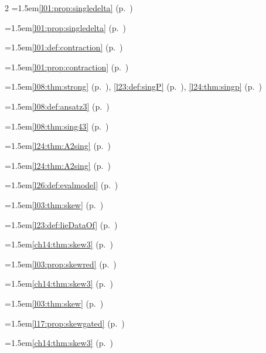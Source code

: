 \begin{multicols}{2}
\hangindent=1.5em\quad \ref{l01:prop:singledelta} (p.~\pageref{l01:prop:singledelta})\par
\hangindent=1.5em\quad \ref{l01:prop:singledelta} (p.~\pageref{l01:prop:singledelta})\par
\hangindent=1.5em\quad \ref{l01:def:contraction} (p.~\pageref{l01:def:contraction})\par
\hangindent=1.5em\quad \ref{l01:prop:contraction} (p.~\pageref{l01:prop:contraction})\par
\hangindent=1.5em\quad \ref{l08:thm:strong} (p.~\pageref{l08:thm:strong}), \ref{l23:def:singP} (p.~\pageref{l23:def:singP}), \ref{l24:thm:singp} (p.~\pageref{l24:thm:singp})\par
\hangindent=1.5em\quad \ref{l08:def:ansatz3} (p.~\pageref{l08:def:ansatz3})\par
\hangindent=1.5em\quad \ref{l08:thm:sing43} (p.~\pageref{l08:thm:sing43})\par
\hangindent=1.5em\quad \ref{l24:thm:A2sing} (p.~\pageref{l24:thm:A2sing})\par
\hangindent=1.5em\quad \ref{l24:thm:A2sing} (p.~\pageref{l24:thm:A2sing})\par
\hangindent=1.5em\quad \ref{l26:def:evalmodel} (p.~\pageref{l26:def:evalmodel})\par
\hangindent=1.5em\quad \ref{l03:thm:skew} (p.~\pageref{l03:thm:skew})\par
\hangindent=1.5em\quad \ref{l23:def:lieDataOf} (p.~\pageref{l23:def:lieDataOf})\par
\hangindent=1.5em\quad \ref{ch14:thm:skew3} (p.~\pageref{ch14:thm:skew3})\par
\hangindent=1.5em\quad \ref{l03:prop:skewred} (p.~\pageref{l03:prop:skewred})\par
\hangindent=1.5em\quad \ref{ch14:thm:skew3} (p.~\pageref{ch14:thm:skew3})\par
\hangindent=1.5em\quad \ref{l03:thm:skew} (p.~\pageref{l03:thm:skew})\par
\hangindent=1.5em\quad \ref{l17:prop:skewgated} (p.~\pageref{l17:prop:skewgated})\par
\hangindent=1.5em\quad \ref{ch14:thm:skew3} (p.~\pageref{ch14:thm:skew3})\par

\end{multicols}

